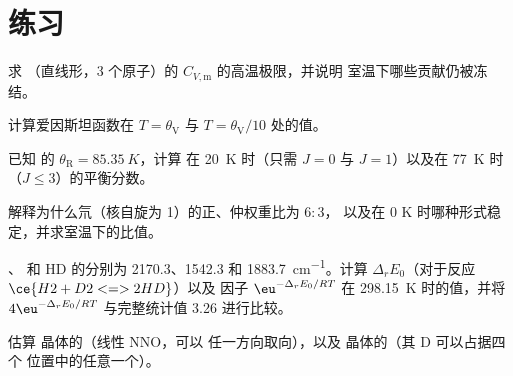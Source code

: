 \section{练习}

\begin{exercise}[$\star$]\label{exo:b3:statistical-thermo-applied:1}
求 （直线形，3 个原子）的 $C_{V,\mathrm m}$ 的高温极限，并说明
室温下哪些贡献仍被冻结。
\end{exercise}

\begin{exercise}[$\star$]\label{exo:b3:statistical-thermo-applied:2}
计算爱因斯坦函数在 $T = \theta_{\mathrm V}$ 与 $T = \theta_{\mathrm V}/10$ 处的值。
\end{exercise}

\begin{exercise}[$\star$]\label{exo:b3:statistical-thermo-applied:3}
已知  的 $\theta_{\mathrm R} = \qty{85.35}{K}$，计算
在 \qty{20}{K} 时（只需 $J = 0$ 与 $J = 1$）以及在 \qty{77}{K} 时（$J \le 3$）的平衡分数。
\end{exercise}

\begin{exercise}[$\star$]\label{exo:b3:statistical-thermo-applied:4}
解释为什么氘（核自旋为 1）的正、仲权重比为 $6 : 3$，
以及在 0 K 时哪种形式稳定，并求室温下的比值。
\end{exercise}

\begin{exercise}[$\star\star$]\label{exo:b3:statistical-thermo-applied:5}
、 和 HD 的分别为 2170.3、1542.3 和
\qty{1883.7}{cm^{-1}}。计算 $\Delta_rE_0$（对于反应 $\ce{H2 + D2 <=> 2 HD}$）以及
因子 $\eu^{-\Delta_rE_0/RT}$ 在 \qty{298.15}{K} 时的值，并将 $4\eu^{-\Delta_rE_0/RT}$ 与完整统计值 3.26 进行比较。
\end{exercise}

\begin{exercise}[$\star\star$]\label{exo:b3:statistical-thermo-applied:6}
估算  晶体的（线性 NNO，可以
任一方向取向），以及  晶体的（其 D 可以占据四个
位置中的任意一个）。
\end{exercise}

